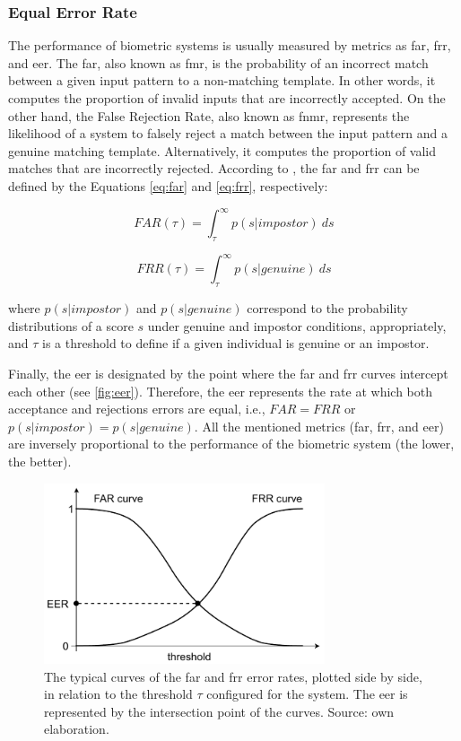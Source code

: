 \subsubsection{Equal Error Rate}

The performance of biometric systems is usually measured by metrics as \acf{far}, \acf{frr}, and \acf{eer}. The \acl{far}, also known as \acf{fmr}, is the probability of an incorrect match between a given input pattern to a non-matching template. In other words, it computes the proportion of invalid inputs that are incorrectly accepted. On the other hand, the False Rejection Rate, also known as \acf{fnmr}, represents the likelihood of a system to falsely reject a match between the input pattern and a genuine matching template. Alternatively, it computes the proportion of valid matches that are incorrectly rejected. According to \cite{ross2006handbook}, the \acs{far} and \acs{frr} can be defined by the Equations \ref{eq:far} and \ref{eq:frr}, respectively:

\begin{equation}
\label{eq:far}
FAR(\tau) = \int_{\tau}^{\infty} p(s|impostor)\ ds
\end{equation}

\begin{equation}
\label{eq:frr}
FRR(\tau) = \int_{\tau}^{\infty} p(s|genuine)\ ds
\end{equation}

\noindent
where $p(s|impostor)$ and $p(s|genuine)$ correspond to the probability distributions of a score $s$ under genuine and impostor conditions, appropriately, and $\tau$ is a threshold to define if a given individual is genuine or an impostor.

Finally, the \acs{eer} is designated by the point where the \acs{far} and \acs{frr} curves intercept each other (see \autoref{fig:eer}). Therefore, the \acs{eer} represents the rate at which both acceptance and rejections errors are equal, i.e., $FAR = FRR$ or $p(s|impostor) = p(s|genuine)$. All the mentioned metrics (\acs{far}, \acs{frr}, and \acs{eer}) are inversely proportional to the performance of the biometric system (the lower, the better).

\begin{figure}[hb]
\centering
\includegraphics[height=2.1in]{images/EER.pdf}
\caption{The typical curves of the \acs{far} and \acs{frr} error rates, plotted side by side, in relation to the threshold $\tau$ configured for the system. The \acs{eer} is represented by the intersection point of the curves. Source: own elaboration.}
\label{fig:eer}
\end{figure}

